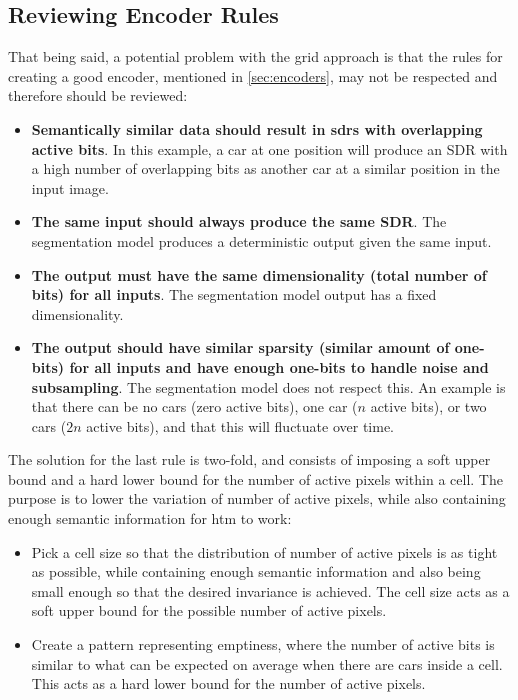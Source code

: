 \subsection{Reviewing Encoder Rules}
That being said, a potential problem with the grid approach is that the rules for creating a good encoder, mentioned in \autoref{sec:encoders}, may not be respected and therefore should be reviewed:
\begin{itemize}
    \item \textbf{Semantically similar data should result in \glspl*{sdr} with overlapping active bits}. In this example, a car at one position will produce an SDR with a high number of overlapping bits as another car at a similar position in the input image.
    \item \textbf{The same input should always produce the same SDR}. The segmentation model produces a deterministic output given the same input.
    \item \textbf{The output must have the same dimensionality (total number of bits) for all inputs}. The segmentation model output has a fixed dimensionality.
    \item \textbf{The output should have similar sparsity (similar amount of one-bits) for all inputs and have enough one-bits to handle noise and subsampling}. The segmentation model does not respect this. An example is that there can be no cars (zero active bits), one car ($n$ active bits), or two cars ($2n$ active bits), and that this will fluctuate over time.
\end{itemize}
The solution for the last rule is two-fold, and  consists of imposing a soft upper bound and a hard lower bound for the number of active pixels within a cell. The purpose is to lower the variation of number of active pixels, while also containing enough semantic information for \gls*{htm} to work:
\begin{itemize}
    \item Pick a cell size so that the distribution of number of active pixels is as tight as possible, while containing enough semantic information and also being small enough so that the desired invariance is achieved. The cell size acts as a soft upper bound for the possible number of active pixels.
    \item Create a pattern representing emptiness, where the number of active bits is similar to what can be expected on average when there are cars inside a cell. This acts as a hard lower bound for the number of active pixels.
\end{itemize}
